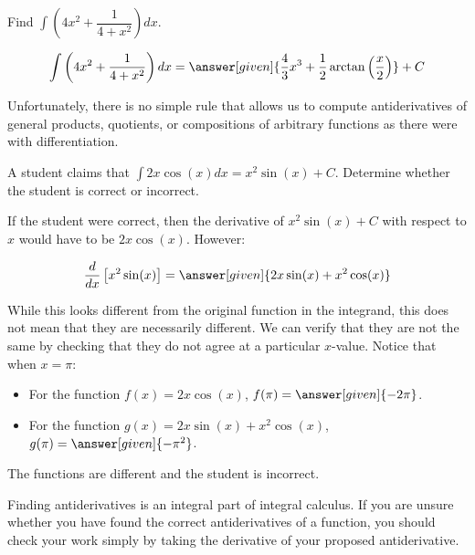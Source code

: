 \documentclass[nooutcomes]{ximera}
\begin{document}
\begin{question} 
  Find $\int \left(4x^2 + \dfrac{1}{4+x^2} \right) dx$.
  \begin{prompt} 
    \[
    \int \left(4x^2 + \dfrac{1}{4+x^2} \right) dx  = \answer[given]{\frac{4}{3} x^3 + \frac{1}{2}\arctan\left(\frac{x}{2}\right)} + C 
    \]
  \end{prompt}
\end{question}



Unfortunately, there is no simple rule that allows us to compute antiderivatives of general products, quotients, or compositions of arbitrary functions as there were with differentiation. 


\begin{example}
  A student claims that $\int 2x \cos(x) dx = x^2 \sin(x) + C$.  Determine whether the student is correct or incorrect.
  
  \begin{explanation}
    If the student were correct, then the derivative of $x^2 \sin(x) + C$ with respect to $x$ would have to be $2x \cos(x)$.  However:
    
      \[\frac{d}{dx} \left[x^2 \sin(x)\right]= \answer[given]{2x \sin(x) + x^2 \cos(x)} \]
      
While this looks different from the original function in the integrand, this does not mean that they are necessarily different.  We can verify that they are not the same by checking that they do not agree at a particular $x$-value.  Notice that when $x=\pi$:
 
 \begin{itemize}
 \item For the function $f(x) = 2x \cos(x)$, $f(\pi) = \answer[given]{-2\pi}$.
 \item For the function $g(x) = 2x \sin(x) +x^2 \cos(x)$, $g(\pi) = \answer[given]{-\pi^2}$.
 \end{itemize}
 The functions are different and the student is incorrect.
  \end{explanation}
\end{example}

\begin{remark}
Finding antiderivatives is an integral part of integral calculus.  If you are unsure whether you have found the correct antiderivatives of a function, you should check your work simply by taking the derivative of your proposed antiderivative.  
\end{remark}
\end{document}
